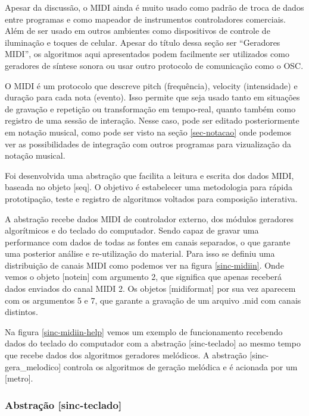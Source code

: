 \documentclass{ppgmus}
\begin{document}
Apesar da discussão, o MIDI ainda é muito usado como padrão de troca de dados entre programas e 
como mapeador de instrumentos controladores comerciais. Além de ser usado em outros ambientes
como dispositivos de controle de iluminação e toques de celular. Apesar do título dessa seção
ser ``Geradores MIDI'', os algoritmos aqui apresentados podem facilmente ser utilizados como
geradores de síntese sonora ou usar outro protocolo de comunicação como o OSC.

O MIDI é um protocolo que descreve pitch (frequência), velocity (intensidade) e duração para cada
nota (evento). Isso permite que seja usado tanto em situações de gravação e repetição ou
transformação em tempo-real, quanto também como registro de uma sessão de interação.
Nesse caso, pode ser editado posteriormente em notação musical, como pode ser
visto na seção \ref{sec-notacao} onde podemos ver as possibilidades de integração
com outros programas para vizualização da notação musical.

Foi desenvolvida uma abstração que facilita a leitura e escrita dos dados MIDI, baseada no
objeto [seq]. O objetivo é estabelecer uma metodologia para rápida prototipação, teste e registro
de algoritmos voltados para composição interativa.

A abstração recebe dados MIDI de controlador externo, dos módulos geradores algorítmicos e do
teclado do computador. Sendo capaz de gravar uma performance com dados de todas as fontes em
canais separados, o que garante uma posterior análise e re-utilização do material. Para isso
se definiu uma distribuição de canais MIDI como podemos ver na figura \ref{sinc-midiin}. Onde vemos
o objeto [notein] com argumento 2, que significa que apenas receberá dados enviados do canal MIDI 2.
Os objetos [midiformat] por sua vez aparecem com os argumentos 5 e 7, que garante a gravação
de um arquivo .mid com canais distintos.


Na figura \ref{sinc-midiin-help} vemos um exemplo de funcionamento recebendo dados do teclado do
computador com a abstração [sinc-teclado] ao mesmo tempo que recebe dados dos algoritmos geradores
melódicos. A abstração [sinc-gera\_melodico] controla os algoritmos de geração melódica e é acionada
por um [metro]. 


\subsubsection{Abstração [sinc-teclado]}


\end{document}

